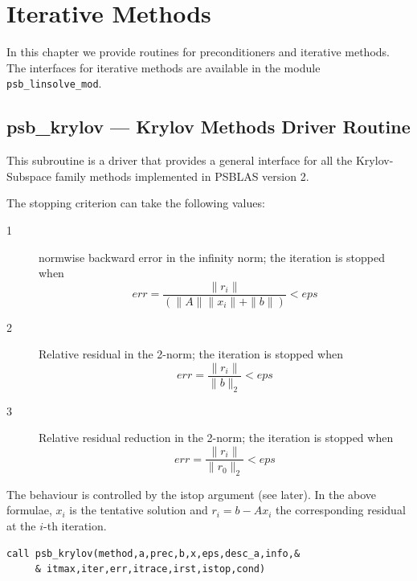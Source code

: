 \section{Iterative Methods}
\label{sec:methods}

In this chapter we provide routines for preconditioners and iterative
methods. The interfaces for iterative  methods are available in
the module \verb|psb_linsolve_mod|.

%
%

\clearpage\subsection{psb\_krylov \label{krylov} --- Krylov Methods Driver
      Routine}

This subroutine is a driver that provides a general interface for all
the Krylov-Subspace family methods implemented in PSBLAS version 2. 

The stopping criterion can take the following values:
\begin{description}
\item[1]  normwise backward error  in the infinity
norm;  the iteration is stopped when 
\[ err = \frac{\|r_i\|}{(\|A\|\|x_i\|+\|b\|)} < eps \]
\item[2] Relative residual in the 2-norm; the iteration is stopped
when
\[ err = \frac{\|r_i\|}{\|b\|_2} < eps \]
\item[3] Relative residual reduction in the 2-norm; the iteration is stopped
when
\[ err = \frac{\|r_i\|}{\|r_0\|_2} < eps \]
\end{description}
The behaviour is controlled by  the  istop argument (see
later). In the above formulae, $x_i$ is the tentative solution and
$r_i=b-Ax_i$ the corresponding residual at the $i$-th iteration. 


\begin{lstlisting}
call psb_krylov(method,a,prec,b,x,eps,desc_a,info,&
     & itmax,iter,err,itrace,irst,istop,cond)
\end{lstlisting}

